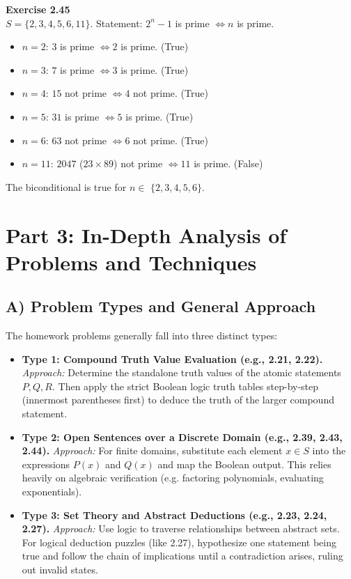 \documentclass[11pt]{article}
\begin{document}
\vspace{10pt}
\textbf{Exercise 2.45} \\
$S=\{2,3,4,5,6,11\}$. Statement: $2^n-1$ is prime $\Leftrightarrow n$ is prime.
\begin{itemize}
    \item $n=2$: $3$ is prime $\Leftrightarrow 2$ is prime. (True)
    \item $n=3$: $7$ is prime $\Leftrightarrow 3$ is prime. (True)
    \item $n=4$: $15$ not prime $\Leftrightarrow 4$ not prime. (True)
    \item $n=5$: $31$ is prime $\Leftrightarrow 5$ is prime. (True)
    \item $n=6$: $63$ not prime $\Leftrightarrow 6$ not prime. (True)
    \item $n=11$: $2047$ ($23 \times 89$) not prime $\Leftrightarrow 11$ is prime. (False)
\end{itemize}
The biconditional is true for $n \in$ \textbf{$\{2, 3, 4, 5, 6\}$}.

\newpage
\section{Part 3: In-Depth Analysis of Problems and Techniques}

\subsection{A) Problem Types and General Approach}
The homework problems generally fall into three distinct types:
\begin{itemize}
    \item \textbf{Type 1: Compound Truth Value Evaluation (e.g., 2.21, 2.22).} 
    \textit{Approach:} Determine the standalone truth values of the atomic statements $P, Q, R$. Then apply the strict Boolean logic truth tables step-by-step (innermost parentheses first) to deduce the truth of the larger compound statement.
    \item \textbf{Type 2: Open Sentences over a Discrete Domain (e.g., 2.39, 2.43, 2.44).} 
    \textit{Approach:} For finite domains, substitute each element $x \in S$ into the expressions $P(x)$ and $Q(x)$ and map the Boolean output. This relies heavily on algebraic verification (e.g. factoring polynomials, evaluating exponentials).
    \item \textbf{Type 3: Set Theory and Abstract Deductions (e.g., 2.23, 2.24, 2.27).} 
    \textit{Approach:} Use logic to traverse relationships between abstract sets. For logical deduction puzzles (like 2.27), hypothesize one statement being true and follow the chain of implications until a contradiction arises, ruling out invalid states.
\end{itemize}
\end{document}
